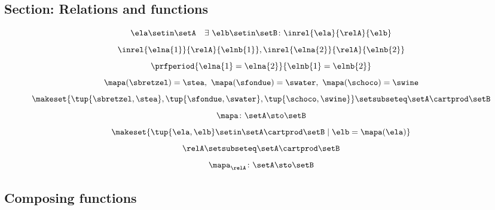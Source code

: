 \begin{forslides}
    \subsection{Section: Relations and functions}

    \begin{equation}
        \label{eq:slides_session2_rel_99}
        \ela \setin \setA \quad \exists \ \elb \setin \setB\colon  \inrel{\ela}{\relA}{\elb}
    \end{equation}
    \begin{equation}
        \label{eq:slides_session2_rel_100}
        \inrel{\elna{1}}{\relA}{\elnb{1}}, \inrel{\elna{2}}{\relA}{\elnb{2}}
    \end{equation}
    \begin{equation}
        \label{eq:slides_session2_rel_101}
        \prfperiod{\elna{1} = \elna{2}}{\elnb{1} = \elnb{2}}
    \end{equation}
    \begin{equation}
        \label{eq:slides_session2_rel_102}
        \mapa (\sbretzel) = \stea, \ \mapa (\sfondue) = \swater, \ \mapa(\schoco) = \swine
    \end{equation}
    \begin{equation}
        \label{eq:slides_session2_rel_103}
        \makeset{ \tup{\sbretzel, \stea}, \tup{\sfondue, \swater}, \tup{\schoco, \swine} } \setsubseteq \setA \cartprod \setB
    \end{equation}
    \begin{equation}
        \label{eq:slides_session2_rel_104}
        \mapa \colon \setA \sto \setB
    \end{equation}
    \begin{equation}
        \label{eq:slides_session2_rel_105}
        \makeset{ \tup{\ela,\elb} \setin \setA \cartprod \setB \mid \elb= \mapa(\ela) }
    \end{equation}
    \begin{equation}
        \label{eq:slides_session2_rel_106}
        \relA \setsubseteq \setA \cartprod \setB
    \end{equation}
    \begin{equation}
        \label{eq:slides_session2_rel_107}
        \mapa_\relA \colon \setA \sto \setB
    \end{equation}

    \subsection{Composing functions}


\end{forslides}
